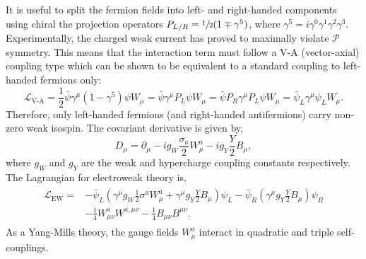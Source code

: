 It is useful to split the fermion fields into left- and right-handed components using chiral the projection operators $P_{L/R} = \sfrac{1}{2} (1 \mp \gamma^5)$, where $\gamma^5 = i \gamma^0 \gamma^1 \gamma^2 \gamma^3$.
Experimentally, the charged weak current has proved to maximally violate $\mathcal{P}$ symmetry.
This means that the interaction term must follow a V-A (vector-axial) coupling type which can be shown to be equivalent to a standard coupling to left-handed fermions only:
\begin{equation}
	\label{eq:v-a_coupling}
	\mathcal{L}_\text{V-A}
	= \frac{1}{2} \bar \psi \gamma^\mu (1 - \gamma^5) \psi W_\mu
	= \bar \psi \gamma^\mu P_L \psi W_\mu
	= \bar \psi P_R \gamma^\mu P_L \psi W_\mu
	= \bar \psi_L \gamma^\mu \psi_L W_\mu.
\end{equation}
Therefore, only left-handed fermions (and right-handed antifermions) carry non-zero weak isospin.
The covariant derivative is given by,
\begin{equation}
	\label{eq:ew_covariant_derivative}
	D_\mu = \partial_\mu - i g_W \frac{\sigma_a}{2} W_\mu^a - i g_Y \frac{Y}{2} B_\mu,
\end{equation}
where $g_W$ and $g_Y$ are the weak and hypercharge coupling constants respectively.
The Lagrangian for electroweak theory is,
\begin{align}
	\begin{split}
		\label{eq:ew_lagrangian}
		\mathcal{L}_\text{EW} = & - \bar{\psi}_L \left( \gamma^\mu g_W \frac{1}{2} \sigma^a W^a_\mu + \gamma^\mu g_Y \frac{Y}{2} B_\mu \right) \psi_L - \bar{\psi}_R \left( \gamma^\mu g_Y \frac{Y}{2} B_\mu \right) \psi_R \\
		                        & - \frac{1}{4} W_{\mu\nu}^a W^{a,\mu\nu} - \frac{1}{4} B_{\mu\nu} B^{\mu\nu}.
	\end{split}
\end{align}
As a Yang-Mills theory, the gauge fields $W_\mu^a$ interact in quadratic and triple self-couplings.

